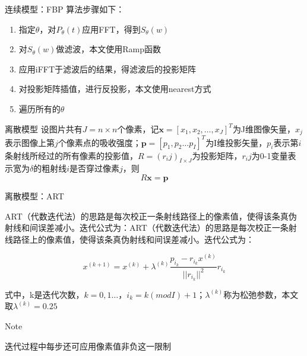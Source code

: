 \documentclass{beamer}
\begin{document}
  
  
\begin{frame}{连续模型：FBP} 
	算法步骤如下：  
	\begin{enumerate}
		\item 指定$\theta$，对\(P_\theta (t)\)应用FFT，得到\(S_\theta (w)\)
		        
		\item 对\(S_\theta (w)\)做滤波，本文使用Ramp函数
		        
		\item 应用iFFT于滤波后的结果，得滤波后的投影矩阵
		        
		\item 对投影矩阵插值，进行反投影，本文使用nearest方式
		\item 遍历所有的$\theta$    
	\end{enumerate}
\end{frame}
  
  
\begin{frame}{离散模型}  
	设图片共有\(J = n\times n\)个像素，记$\textbf{x}=[x_{1},x_{2} ,\ldots ,x_{J}]^T$为J维图像矢量，\(x_j\)表示图像上第\(j\)个像素点的吸收强度；$\textbf{p}=[p_{1},p_{2} \ldots p_{I}]^T$为I维投影矢量，$p_i$表示第\(i\)条射线所经过的所有像素的投影值，$R=(r_ij)_{I\times J}$为投影矩阵，\(r_ij\)为0-1变量表示宽为\(\delta\)的粗射线\(i\)是否穿过像素\(j\)，则	  
	\begin{equation}
		R\textbf{x}=\textbf{p}
	\end{equation}
\end{frame}
  
  
  
\begin{frame}{离散模型：ART}
	  
	ART（代数迭代法）的思路是每次校正一条射线路径上的像素值，使得该条真伪射线和间误差减小。迭代公式为：ART（代数迭代法）的思路是每次校正一条射线路径上的像素值，使得该条真伪射线和间误差减小。迭代公式为：
	  
	\begin{equation}
		x^{(k+1)}=x^{(k)}+\lambda^{(k)}\frac{p_{i_{k}}-r_{i_{k}}x^{(k)}}{||r_{i_{k}}||^{2}}r_{i_{k}}
	\end{equation}
	  
	式中，k是迭代次数，$k=0,1 \ldots$，$i_{k}=k(modI)+1$；$\lambda^{(k)}$称为松弛参数，本文取$\lambda^{(k)}=0.25$
	  
	\begin{alertblock}{Note}
		  
		迭代过程中每步还可应用像素值非负这一限制
		  
	\end{alertblock}
	  
\end{frame}
  
\end{document}
